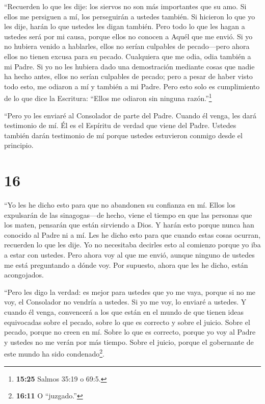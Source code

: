  ``Recuerden lo que les dije: los siervos no son más
importantes que su amo. Si ellos me persiguen a mí, los perseguirán a
ustedes también. Si hicieron lo que yo les dije, harán lo que ustedes
les digan también.  Pero todo lo que les hagan a ustedes
será por mi causa, porque ellos no conocen a Aquél que me envió.
 Si yo no hubiera venido a hablarles, ellos no serían
culpables de pecado---pero ahora ellos no tienen excusa para su pecado.
 Cualquiera que me odia, odia también a mi Padre.
 Si yo no les hubiera dado una demostración mediante cosas
que nadie ha hecho antes, ellos no serían culpables de pecado; pero a
pesar de haber visto todo esto, me odiaron a mí y también a mi Padre.
 Pero esto solo es cumplimiento de lo que dice la
Escritura: ``Ellos me odiaron sin ninguna razón.''\footnote{\textbf{15:25}
  Salmos 35:19 o 69:5.}

 ``Pero yo les enviaré al Consolador de parte del Padre.
Cuando él venga, les dará testimonio de mí. Él es el Espíritu de verdad
que viene del Padre.  Ustedes también darán testimonio de
mí porque ustedes estuvieron conmigo desde el principio.

\hypertarget{section-15}{%
\section{16}\label{section-15}}

 ``Yo les he dicho esto para que no abandonen su confianza
en mí.  Ellos los expulsarán de las sinagogas---de hecho,
viene el tiempo en que las personas que los maten, pensarán que están
sirviendo a Dios.  Y harán esto porque nunca han conocido al
Padre ni a mí. Les he dicho esto para que cuando estas cosas ocurran,
recuerden lo que les dije.  Yo no necesitaba decirles esto
al comienzo porque yo iba a estar con ustedes.  Pero ahora
voy al que me envió, aunque ninguno de ustedes me está preguntando a
dónde voy.  Por supuesto, ahora que les he dicho, están
acongojados.

 ``Pero les digo la verdad: es mejor para ustedes que yo me
vaya, porque si no me voy, el Consolador no vendría a ustedes. Si yo me
voy, lo enviaré a ustedes.  Y cuando él venga, convencerá a
los que están en el mundo de que tienen ideas equivocadas sobre el
pecado, sobre lo que es correcto y sobre el juicio.  Sobre
el pecado, porque no creen en mí.  Sobre lo que es
correcto, porque yo voy al Padre y ustedes no me verán por más tiempo.
 Sobre el juicio, porque el gobernante de este mundo ha
sido condenado\footnote{\textbf{16:11} O ``juzgado.''}.

